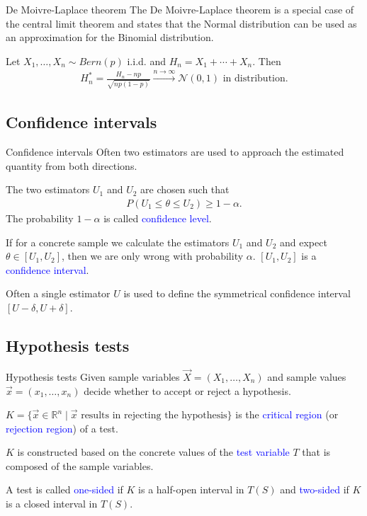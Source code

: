 \documentclass{beamer}
\def\padding{\vspace{0.5cm}}
\def\spadding{\vspace{0.25cm}}
\def\b{\textcolor{blue}}
\begin{document}
\begin{frame}
    \begin{block}{De Moivre-Laplace theorem}
        The De Moivre-Laplace theorem is a special case of the central limit theorem and states that the Normal distribution can be used as an approximation for the Binomial distribution.\pause\par\spadding
        Let $X_1, \dots, X_n \sim Bern(p)$ i.i.d. and $H_n = X_1 + \cdots + X_n$. Then
        \begin{align*}
            H_n^* = \frac{H_n - n p}{\sqrt{n p (1 - p)}} \xrightarrow{n \to \infty} \mathcal{N}(0,1) \text{ in distribution}.
        \end{align*}
    \end{block}
\end{frame}

\subsection{Confidence intervals}
\begin{frame}{Confidence intervals}
    Often two estimators are used to approach the estimated quantity from both directions.\pause\par
    The two estimators $U_1$ and $U_2$ are chosen such that
    \begin{align*}
        P(U_1 \leq \theta \leq U_2) \geq 1 - \alpha.
    \end{align*}\pause
    The probability $1 - \alpha$ is called \b{confidence level}.\pause\par\padding
    If for a concrete sample we calculate the estimators $U_1$ and $U_2$ and expect $\theta \in [U_1, U_2]$, then we are only wrong with probability $\alpha$. $[U_1, U_2]$ is a \b{confidence interval}.\pause\par\spadding
    Often a single estimator $U$ is used to define the symmetrical confidence interval $[U - \delta, U + \delta]$.
\end{frame}

\subsection{Hypothesis tests}
\begin{frame}{Hypothesis tests}
    Given sample variables $\overrightarrow{X} = (X_1, \dots, X_n)$ and sample values $\overrightarrow{x} = (x_1, \dots, x_n)$ decide whether to accept or reject a hypothesis.\pause\par\padding
    $K = \{\overrightarrow{x} \in \mathbb{R}^n \mid \overrightarrow{x} \text{ results in rejecting the hypothesis}\}$ is the \b{critical region} (or \b{rejection region}) of a test.\pause\par\padding
    $K$ is constructed based on the concrete values of the \b{test variable} $T$ that is composed of the sample variables.\pause\par\padding
    A test is called \b{one-sided} if $K$ is a half-open interval in $T(S)$ and \b{two-sided} if $K$ is a closed interval in $T(S)$.
\end{frame}
\end{document}
